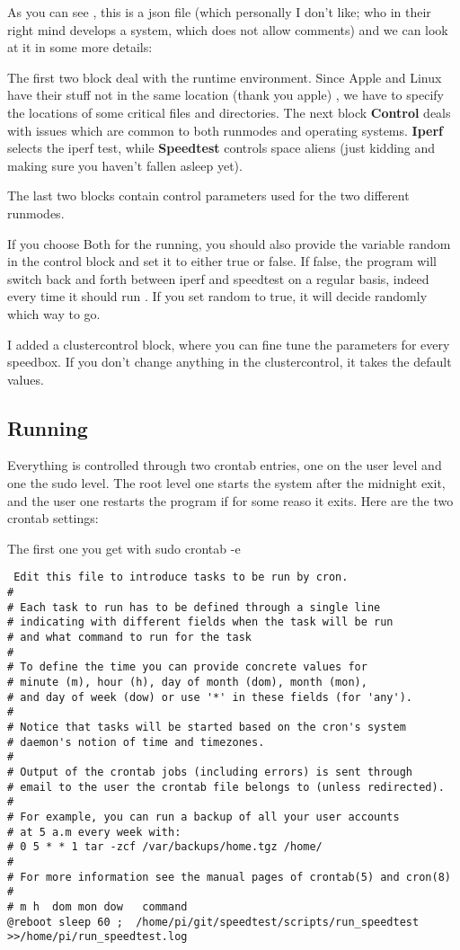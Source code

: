 \documentclass[11pt]{article}
\begin{document}
As you can see , this is a json file (which personally I don't like; who in their right mind develops a system, which does not allow comments) and we can look at it in some more details:

The first two block deal with the runtime environment. Since Apple and Linux have their stuff not in the same location (thank you apple) , we have to specify the locations of some critical files and directories. The next block \textbf{Control} deals with issues which are common to both runmodes and operating systems. \textbf{Iperf} selects the iperf test, while \textbf{Speedtest} controls space aliens (just kidding and making sure you haven't fallen asleep yet).

The last two blocks contain control parameters used for the two different runmodes.

If you choose Both for the running, you should also provide the variable random in the control block and set it to either true or false. If false, the program will switch back and forth between iperf and speedtest on a regular basis, indeed every time it should run . If you set random to true, it will decide randomly which way to go.

I added a clustercontrol block, where you can fine tune the parameters for every speedbox. If you don't change anything in the clustercontrol, it takes the default values.

\subsection{Running}

Everything is controlled through two crontab entries, one on the user level and one the sudo level.
The root level one starts the system after the midnight exit, and the user one restarts the program if for some reaso it exits. Here are the two crontab settings:

The first one you get with sudo crontab -e
\begin{verbatim}
 Edit this file to introduce tasks to be run by cron.
# 
# Each task to run has to be defined through a single line
# indicating with different fields when the task will be run
# and what command to run for the task
# 
# To define the time you can provide concrete values for
# minute (m), hour (h), day of month (dom), month (mon),
# and day of week (dow) or use '*' in these fields (for 'any').
# 
# Notice that tasks will be started based on the cron's system
# daemon's notion of time and timezones.
# 
# Output of the crontab jobs (including errors) is sent through
# email to the user the crontab file belongs to (unless redirected).
# 
# For example, you can run a backup of all your user accounts
# at 5 a.m every week with:
# 0 5 * * 1 tar -zcf /var/backups/home.tgz /home/
# 
# For more information see the manual pages of crontab(5) and cron(8)
# 
# m h  dom mon dow   command
@reboot sleep 60 ;  /home/pi/git/speedtest/scripts/run_speedtest >>/home/pi/run_speedtest.log
\end{verbatim}
\end{document}
